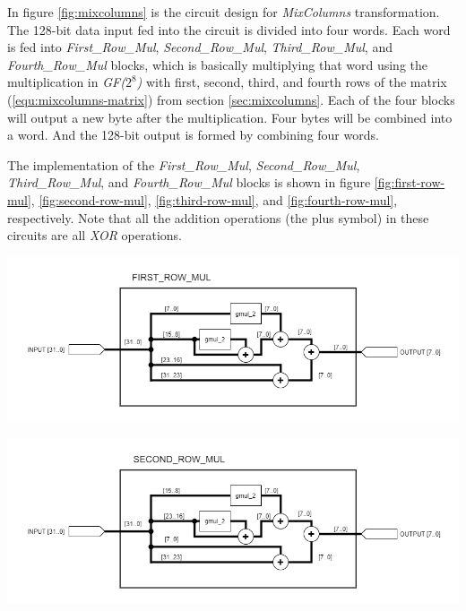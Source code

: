 \documentclass[a4paper, 10pt]{article}
\newenvironment{Figure}
    {\par\medskip\noindent\minipage{\linewidth}}
    {\endminipage\par\medskip}
\begin{document}
\begin{multicols}{2}
            In figure \ref{fig:mixcolumns} is the circuit design for \textit{MixColumns} transformation. The 128-bit data input fed into the circuit is divided into four words. Each word is fed into \textit{First\_Row\_Mul}, \textit{Second\_Row\_Mul}, \textit{Third\_Row\_Mul}, and \textit{Fourth\_Row\_Mul} blocks, which is basically multiplying that word using the multiplication in \textit{GF($2^{8}$)} with first, second, third, and fourth rows of the matrix (\ref{equ:mixcolumns-matrix}) from section \ref{sec:mixcolumns}. Each of the four blocks will output a new byte after the multiplication. Four bytes will be combined into a word. And the 128-bit output is formed by combining four words.

            The implementation of the \textit{First\_Row\_Mul}, \textit{Second\_Row\_Mul}, \textit{Third\_Row\_Mul}, and \textit{Fourth\_Row\_Mul} blocks is shown in figure \ref{fig:first-row-mul}, \ref{fig:second-row-mul}, \ref{fig:third-row-mul}, and \ref{fig:fourth-row-mul}, respectively. Note that all the addition operations (the plus symbol) in these circuits are all \textit{XOR} operations.

            \noindent
            \begin{Figure}
                \centering
                \includegraphics[width=\linewidth]{First_Row_Mul.png}
                \label{fig:first-row-mul}
            \end{Figure}

            \noindent
            \begin{Figure}
                \centering
                \includegraphics[width=\linewidth]{Second_Row_Mul.png}
                \label{fig:second-row-mul}
            \end{Figure}


\end{multicols}
\end{document}
